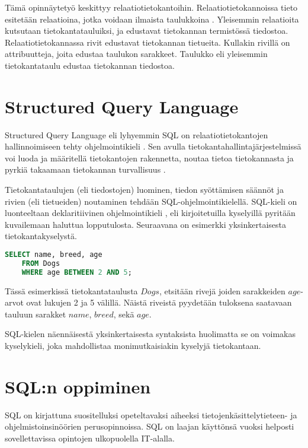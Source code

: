 \documentclass[finnish,twoside,openright]{HYgraduMLDS}
\begin{document}
Tämä opinnäytetyö keskittyy relaatiotietokantoihin. Relaatiotietokannoissa tieto esitetään relaatioina, jotka voidaan ilmaista taulukkoina \cite{tikape2019}. Yleisemmin relaatioita kutsutaan tietokantatauluiksi, ja edustavat tietokannan termistössä tiedostoa. Relaatiotietokannassa rivit edustavat tietokannan tietueita. Kullakin rivillä on attribuutteja, joita edustaa taulukon sarakkeet. Taulukko eli yleisemmin tietokantataulu edustaa tietokannan tiedostoa.


\section{Structured Query Language}

Structured Query Language eli lyhyemmin SQL on relaatiotietokantojen \cite{Codd:1970:RMD:362384.362685} hallinnoimiseen tehty ohjelmointikieli \cite{tikape2019}. Sen avulla tietokantahallintajärjestelmissä voi luoda ja määritellä tietokantojen rakennetta, noutaa tietoa tietokannasta ja pyrkiä takaamaan tietokannan turvallisuus \cite{wilton2005beginning}.

Tietokantataulujen (eli tiedostojen) luominen, tiedon syöttämisen säännöt ja rivien (eli tietueiden) noutaminen tehdään SQL-ohjelmointikielellä. SQL-kieli on luonteeltaan deklaritiivinen ohjelmointikieli \cite{sadiq2004sqlator}, eli kirjoitetuilla kyselyillä pyritään kuvailemaan haluttua lopputulosta. Seuraavana on esimerkki yksinkertaisesta tietokantakyselystä.

\begin{lstlisting}[language=SQL]
    SELECT name, breed, age
    FROM Dogs
    WHERE age BETWEEN 2 AND 5;
\end{lstlisting}

Tässä esimerkissä tietokantataulusta $Dogs$, etsitään rivejä joiden sarakkeiden $age$-arvot ovat lukujen 2 ja 5 välillä. Näistä riveistä pyydetään tuloksena saatavaan tauluun sarakket $name$, $breed$, sekä $age$.

SQL-kielen näennäisestä yksinkertaisesta syntaksista huolimatta se on voimakas kyselykieli, joka mahdollistaa monimutkaisiakin kyselyjä tietokantaan.


\section{SQL:n oppiminen}

SQL on kirjattuna suositelluksi opeteltavaksi aiheeksi tietojenkäsittelytieteen- \cite{acm2013currilum} ja ohjelmistoinsinöörien \cite{swebok} perusopinnoissa. SQL on laajan käyttönsä vuoksi helposti sovellettavissa opintojen ulkopuolella IT-alalla.
\end{document}
